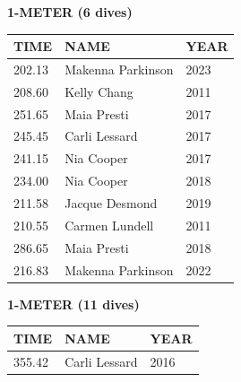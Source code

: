 \begin{table}[H]
\centering
\begin{minipage}[t]{0.6\textwidth}
\centering
\textbf{1-METER (6 dives)}\\[0.1cm]
\begin{tabular}{@{}p{1.8cm}p{2.8cm}p{1.2cm}@{}}
\hline
    \textbf{TIME} & \textbf{NAME} & \textbf{YEAR} \\
\hline
    202.13 & Makenna Parkinson & 2023 \\
    208.60 & Kelly Chang & 2011 \\
    251.65 & Maia Presti & 2017 \\
    245.45 & Carli Lessard & 2017 \\
    241.15 & Nia Cooper & 2017 \\
    234.00 & Nia Cooper & 2018 \\
    211.58 & Jacque Desmond & 2019 \\
    210.55 & Carmen Lundell & 2011 \\
    286.65 & Maia Presti & 2018 \\
    216.83 & Makenna Parkinson & 2022 \\
\hline
\end{tabular}
\end{minipage}
\end{table}

\begin{table}[H]
\centering
\begin{minipage}[t]{0.6\textwidth}
\centering
\textbf{1-METER (11 dives)}\\[0.1cm]
\begin{tabular}{@{}p{1.8cm}p{2.8cm}p{1.2cm}@{}}
\hline
    \textbf{TIME} & \textbf{NAME} & \textbf{YEAR} \\
\hline
    355.42 & Carli Lessard & 2016 \\
\hline
\end{tabular}
\end{minipage}
\end{table}

